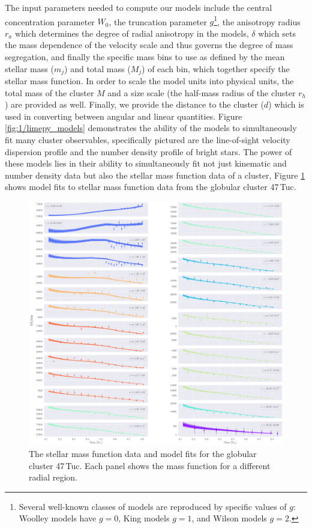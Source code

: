 The input parameters needed to compute our models include the central concentration parameter $W_0$,
the truncation parameter $g$\footnote{Several well-known classes of models are reproduced by
specific values of $g$: Woolley models \citep{Woolley1954} have $g=0$, King models \citep{King1966}
$g=1$, and Wilson models \citep{Wilson1975} $g=2$.}, the anisotropy radius $r_a$ which determines
the degree of radial anisotropy in the models, $\delta$ which sets the mass dependence of the
velocity scale and thus governs the degree of mass segregation, and finally the specific mass bins
to use as defined by the mean stellar mass ($m_j$) and total mass ($M_j$) of each bin, which
together specify the stellar mass function. In order to scale the model units into physical units,
the total mass of the cluster $M$ and a size scale (the half-mass radius of the cluster $r_h$) are
provided as well. Finally, we provide the distance to the cluster ($d$) which is used in converting between
angular and linear quantities. Figure \ref{fig:1/limepy_models} demonstrates the ability of the
models to simultaneously fit many cluster observables, specifically pictured are the line-of-sight
velocity dispersion profile and the number density profile of bright stars. The power of these
models lies in their ability to simultaneously fit not just kinematic and number density data but
also the stellar mass function data of a cluster, Figure \ref{fig:1/massfunc_fit} shows model fits
to stellar mass function data from the globular cluster 47\,Tuc.


\begin{figure}
	\centering
	\includegraphics[width=\textwidth]{./figures/prev_nobin/mass_fun.png}
	\caption{The stellar mass function data and model fits for the globular cluster 47\,Tuc.
		Each panel shows the mass function for a different radial region.}
	\label{fig:1/massfunc_fit}
\end{figure}


